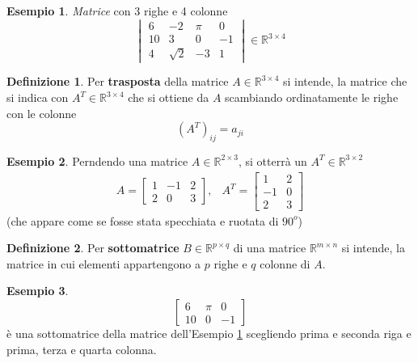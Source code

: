\documentclass{book}
\theoremstyle{definition}
\newtheorem{defi}{Definizione}[section]
\newtheorem{es}{Esempio}[section]
\theoremstyle{plain}
\begin{document}
\begin{es}
  \label{es:matrice1}
  \textit{Matrice} con 3 righe e 4 colonne
  \begin{equation*}
    \begin{vmatrix}
      6 & -2 & \pi & 0\\
      10 & 3 & 0 & -1\\
      4 & \sqrt{2} & -3 & 1
    \end{vmatrix} \in \mathds{R}^{3 \times 4}
  \end{equation*}
\end{es}
\begin{defi}
  \label{defi:matrice2}
  Per \textbf{trasposta} della matrice $A\in \mathds{R}^{3\times 4}$ si
  intende, la matrice che si indica con $A^T\in \mathds{R}^{3\times 4}$ che
  si ottiene da $A$ scambiando ordinatamente le righe con le colonne
  \begin{equation*}
    (A^T)_{ij}=a_{ji}
  \end{equation*}
\end{defi}
\begin{es}
  \label{es:matrice2}
  Perndendo una matrice $A \in \mathds{R}^{2\times3}$, si otterrà un
  $A^T\in \mathds{R}^{3\times2}$
  \begin{eqnarray*}
    A=
    \begin{bmatrix}
      1 & -1 & 2\\
      2 & 0 & 3
    \end{bmatrix}, & A^T=
                     \begin{bmatrix}
                       1 & 2  \\
                       -1 & 0 \\
                       2 & 3
                     \end{bmatrix}
  \end{eqnarray*}
  (che appare come se fosse stata specchiata e ruotata di $90^o$)
\end{es}
\begin{defi}
  \label{defi:matrice3}
  Per \textbf{sottomatrice} $B\in\mathds{R}^{p\times q}$ di una matrice
  $\mathds{R}^{m \times n}$ si intende, la matrice in cui elementi
  appartengono a $p$ righe e $q$ colonne di $A$.
\end{defi}
\begin{es}
  \label{es:matrice3}
  \begin{equation*}
    \begin{bmatrix}
      6 & \pi & 0\\
      10 & 0 & -1
    \end{bmatrix}
  \end{equation*}
  è una sottomatrice della matrice dell'Esempio \ref{es:matrice1}
  scegliendo prima e seconda riga e prima, terza e quarta colonna.
\end{es}
\end{document}

